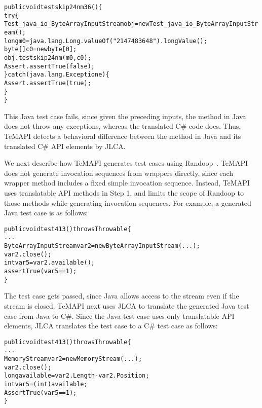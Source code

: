 \begin{CodeOut}%
\begin{alltt}
public void testskip24nm36()\{
  try\{
     Test_java_io_ByteArrayInputStream obj = new Test_java_io_ByteArrayInputStream();
     long m0 = java.lang.Long.valueOf("2147483648").longValue();
     byte[] c0 = new byte[0];
     obj.testskip24nm(m0,c0);
     Assert.assertTrue(false);
  \}catch(java.lang.Exception e)\{
     Assert.assertTrue(true);
  \}
\}
\end{alltt}
\end{CodeOut}%

This Java test case fails, since given the preceding inputs, the  method in Java does not throw any exceptions, whereas the translated C\# code does. Thus, TeMAPI detects a behavioral difference between the  method in Java and its translated C\# API elements by JLCA.

We next describe how TeMAPI generates test cases using Randoop~\cite{pacheco2007feedback}. TeMAPI does not generate invocation sequences from wrappers directly, since each wrapper method includes a fixed simple invocation sequence. Instead, TeMAPI uses translatable API methods in Step 1, and limits the scope of Randoop to those methods while generating invocation sequences. For example, a generated Java test case is as follows:

\begin{CodeOut}%
\begin{alltt}
public void test413() throws Throwable \{
  ...
  ByteArrayInputStream var2=new ByteArrayInputStream(...);
  var2.close();
  int var5=var2.available();
  assertTrue(var5 == 1);
\}
\end{alltt}
\end{CodeOut}%


The test case gets passed, since Java allows access to the stream even if the stream is closed. TeMAPI next uses JLCA to translate the generated Java test case from Java to C\#. Since the Java test case uses only translatable API elements, JLCA translates the test case to a C\# test case as follows:

\begin{CodeOut}%
\begin{alltt}
public void test413() throws Throwable\{
  ...
  MemoryStream var2 = new MemoryStream(...);
  var2.close();
  long available = var2.Length - var2.Position;
  int var5 = (int) available;
  AssertTrue(var5 == 1);
\}
\end{alltt}
\end{CodeOut}%

